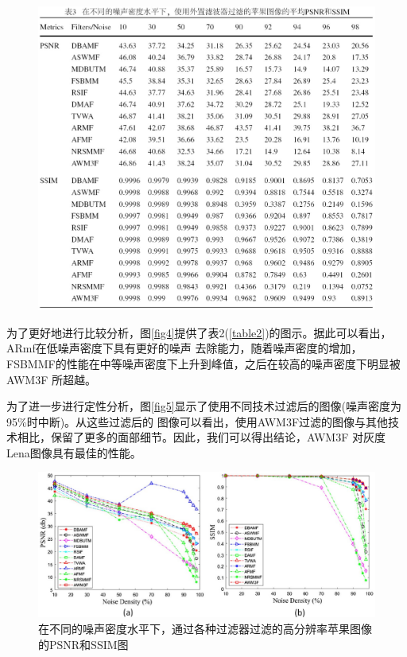 \documentclass[12pt]{article} %
\begin{document}
\begin{figure}[H]
    \centering
    \includegraphics[width=1\textwidth]{images/07.eps}    
    \label{table3}
\end{figure}

\hspace{2em}为了更好地进行比较分析，图\ref{fig4}提供了表2(\ref{table2})的图示。据此可以看出，ARmf\cite{ref8}在低噪声密度下具有更好的噪声
去除能力，随着噪声密度的增加，FSBMMF\cite{ref29}的性能在中等噪声密度下上升到峰值，之后在较高的噪声密度下明显被AWM3F
\cite{ref23}所超越。

\hspace{2em}为了进一步进行定性分析，图\ref{fig5}显示了使用不同技术过滤后的图像(噪声密度为95\%时中断)。从这些过滤后的
图像可以看出，使用AWM3F\cite{ref23}过滤的图像与其他技术相比，保留了更多的面部细节。因此，我们可以得出结论，AWM3F
\cite{ref23}对灰度Lena图像具有最佳的性能。

\begin{figure}[H]
    \centering
    \includegraphics[width=1\textwidth]{images/08.eps}
    \caption{在不同的噪声密度水平下，通过各种过滤器过滤的高分辨率苹果图像的PSNR和SSIM图}
    \label{fig6}
\end{figure}
\end{document}
